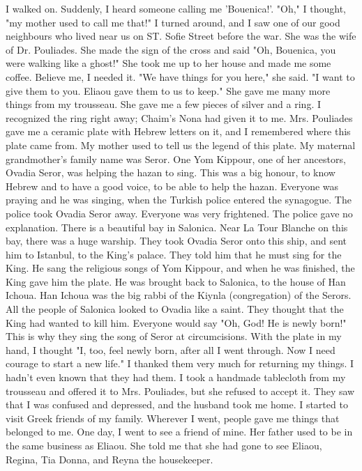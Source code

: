 I walked on.
Suddenly, I heard someone calling me 'Bouenica!’.
"Oh," I thought, "my mother used to call me that!"
I turned around, 
and I saw one of our good neighbours who lived near us on ST.
Sofie 
Street before the war.
She was the wife of Dr.
Pouliades.
She made the 
sign of the cross and said "Oh, Bouenica, you were walking like a 
ghost!"
She took me up to her house and made me some coffee.
Believe 
me, I needed it.
"We have things for you here," she said.
"I want to give them to
you.
Eliaou gave them to us to keep."
She gave me many more things 
from my trousseau.
She gave me a few pieces of silver and a ring.
I 
recognized the ring right away; Chaim's Nona had given it to me.
Mrs.
Pouliades gave me a ceramic plate with Hebrew letters on it, and I remembered where this plate came from.
My mother used to tell us the legend of this plate.
My maternal 
grandmother's family name was Seror.
One Yom Kippour, one of her 
ancestors, Ovadia Seror, was helping the hazan to sing.
This was a big 
honour, to know Hebrew and to have a good voice, to be able to help the 
hazan.
Everyone was praying and he was singing, when the Turkish police entered the synagogue.
The police took Ovadia Seror away.
Everyone was very frightened.
The police gave no explanation.
There is a 
beautiful bay in Salonica.
Near La Tour Blanche on this bay, there 
was a huge warship.
They took Ovadia Seror onto this ship, and sent 
him to Istanbul, to the King’s palace.
They told him that he must sing 
for the King.
He sang the religious songs of Yom Kippour, and when he 
was finished, the King gave him the plate.
He was brought back to Salonica, to the house of Han Ichoua.
Han Ichoua was the big rabbi of 
the Kiynla (congregation) of the Serors.
All the people of Salonica 
looked to Ovadia like a saint.
They thought that the King had wanted 
to kill him.
Everyone would say "Oh, God!
He is newly born!"
This 
is why they sing the song of Seror at circumcisions.
With the plate in my hand, I thought "I, too, feel newly born, after all I went through.
Now I need courage to start a new life."
I 
thanked them very much for returning my things.
I hadn't even known 
that they had them.
I took a handmade tablecloth from my trousseau and 
offered it to Mrs.
Pouliades, but she refused to accept it.
They saw 
that I was confused and depressed, and the husband took me home.
I started to visit Greek friends of my family.
Wherever I went, people gave me 
things that belonged to me.
One day, I went to see a friend of mine.
Her father used 
to be in the same business as Eliaou.
She told me that she had gone to see Eliaou, Regina, Tia Donna, and Reyna the housekeeper.
